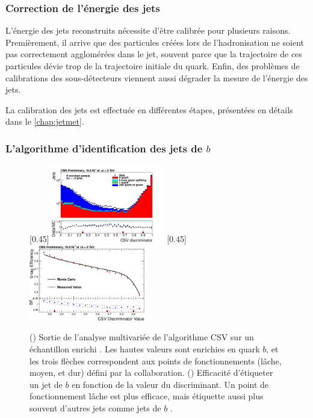 \subsubsection{Correction de l'énergie des jets}

L'énergie des jets reconstruits nécessite d'être calibrée pour plusieurs raisons. Premièrement, il arrive que des particules créées lors de l'hadronisation ne soient pas correctement agglomérées dans le jet, souvent parce que la trajectoire de ces particules dévie trop de la trajectoire initiale du quark. Enfin, des problèmes de calibrations des sous-détecteurs viennent aussi dégrader la mesure de l'énergie des jets.

La calibration des jets est effectuée en différentes étapes, présentées en détails dans le \cref{chap:jetmet}.

\subsubsection{L'algorithme d'identification des jets de $b$}

\begin{figure}[tbp]
    \centering
    \subcaptionbox{\label{fig:btag_discri}}[0.45\textwidth]{\includegraphics[width=0.45\textwidth]{chapitre3/figs/btag_tt_csv.pdf}} \hfill
    \subcaptionbox{\label{fig:btag_csv_eff}}[0.45\textwidth]{\includegraphics[width=0.45\textwidth]{chapitre3/figs/btag_csv_eff.pdf}}
    \caption{() Sortie de l'analyse multivariée de l'algorithme CSV sur un échantillon enrichi \ttbar. Les hautes valeurs sont enrichies en quark $b$, et les trois flèches correspondent aux points de fonctionnements (lâche, moyen, et dur) défini par la collaboration. () Efficacité d'étiqueter un jet de $b$ en fonction de la valeur du discriminant. Un point de fonctionnement lâche est plus efficace, mais étiquette aussi plus souvent d'autres jets comme jets de $b$ \citep{btag_perf}.}
    \label{fig:btag_perf}
\end{figure}


